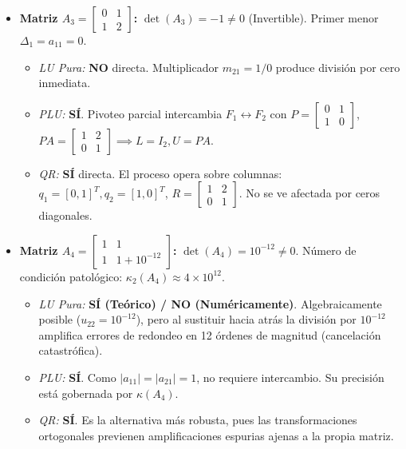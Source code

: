 \documentclass[11pt,a4paper]{article}
\theoremstyle{definition}
\theoremstyle{remark}
\begin{document}
\begin{itemize}[leftmargin=*]
    \item \textbf{Matriz $A_3 = \begin{bmatrix} 0 & 1 \\ 1 & 2 \end{bmatrix}$:}
    $\det(A_3) = -1 \neq 0$ (Invertible). Primer menor $\Delta_1 = a_{11} = 0$.
    \begin{itemize}
        \item \textit{LU Pura:} \textbf{NO} directa. Multiplicador $m_{21} = 1/0$ produce división por cero inmediata.
        \item \textit{PLU:} \textbf{SÍ}. Pivoteo parcial intercambia $F_1 \leftrightarrow F_2$ con $P = \begin{bmatrix} 0 & 1 \\ 1 & 0 \end{bmatrix}$, $PA = \begin{bmatrix} 1 & 2 \\ 0 & 1 \end{bmatrix} \implies L = I_2, U = PA$.
        \item \textit{QR:} \textbf{SÍ} directa. El proceso opera sobre columnas: $q_1 = [0, 1]^T, q_2 = [1, 0]^T$, $R = \begin{bmatrix} 1 & 2 \\ 0 & 1 \end{bmatrix}$. No se ve afectada por ceros diagonales.
    \end{itemize}

    \item \textbf{Matriz $A_4 = \begin{bmatrix} 1 & 1 \\ 1 & 1 + 10^{-12} \end{bmatrix}$:}
    $\det(A_4) = 10^{-12} \neq 0$. Número de condición patológico: $\kappa_2(A_4) \approx 4 \times 10^{12}$.
    \begin{itemize}
        \item \textit{LU Pura:} \textbf{SÍ (Teórico) / NO (Numéricamente)}. Algebraicamente posible ($u_{22} = 10^{-12}$), pero al sustituir hacia atrás la división por $10^{-12}$ amplifica errores de redondeo en 12 órdenes de magnitud (cancelación catastrófica).
        \item \textit{PLU:} \textbf{SÍ}. Como $|a_{11}| = |a_{21}| = 1$, no requiere intercambio. Su precisión está gobernada por $\kappa(A_4)$.
        \item \textit{QR:} \textbf{SÍ}. Es la alternativa más robusta, pues las transformaciones ortogonales previenen amplificaciones espurias ajenas a la propia matriz.
    \end{itemize}
\end{itemize}
\end{document}
